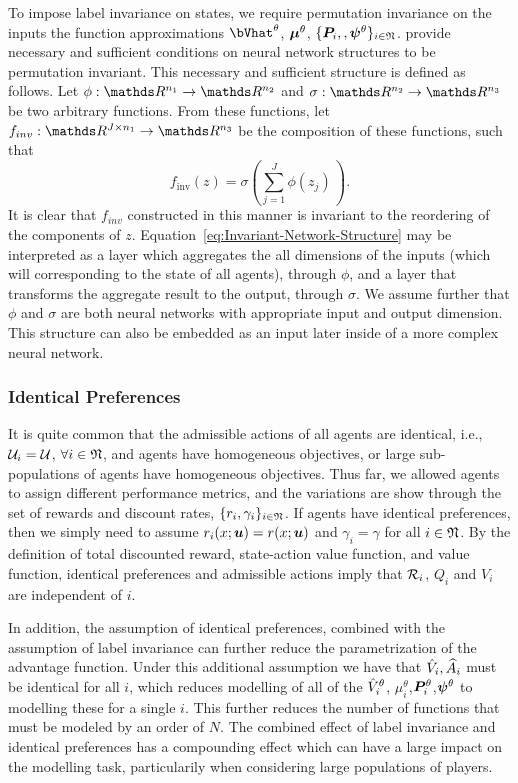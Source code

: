 \documentclass[onefignum,onetabnum]{siamonline171218}
\begin{document}
To impose label invariance on states, we require  permutation invariance on the inputs the function approximations $\bVhat^\theta$, $\bm{\mu}^{\theta}$, $\{\bm{P}_i,,\bm{\psi}^{\theta}\}_{i\in{\mathfrak{N}}}$. \cite{zaheer2017deep} provide necessary and sufficient conditions on neural network structures to be  permutation invariant. 
This necessary and sufficient structure is defined as follows. 
Let $\phi:\R^{n_1} \rightarrow \R^{n_2}$ and $\sigma:\R^{n_2} \rightarrow \R^{n_3}$ be two arbitrary functions. From these functions, let $f_{inv}:\R^{J \times n_1}\rightarrow\R^{n_3}$ be the composition of these functions, such that
\begin{equation} \label{eq:Invariant-Network-Structure}
	f_{\text{inv}}(z) = \sigma\left( \sum_{j=1}^J\phi( z_j ) \,\right).
\end{equation}
It is clear that $f_{inv}$ constructed in this manner is  invariant to the reordering of the components of $z$. Equation~\eqref{eq:Invariant-Network-Structure} may be interpreted as  a layer which aggregates the all dimensions of the inputs (which will corresponding to the state of all agents), through $\phi$, and a layer that transforms the aggregate result to the output, through $\sigma$. We assume further that $\phi$ and $\sigma$ are both neural networks with appropriate input and output dimension. This structure can also be embedded as an input later inside of a more complex neural network.


\subsubsection*{Identical Preferences}

It is quite common that  the admissible actions of all agents are identical,  i.e., $\mathcal{U}_i=\mathcal{U}$, $\forall i\in{\mathfrak{N}}$, and agents have  homogeneous   objectives, or large sub-populations of agents have homogeneous objectives.  Thus far, we allowed agents to assign different performance metrics, and the variations are show through the set of rewards and discount rates, $\{ r_i, \gamma_i \}_{i\in{\mathfrak{N}}}$. If agents have identical preferences, then we simply need to assume $r_i(x;{\bm{u}})=r(x;{\bm{u}})$ and $\gamma_i = \gamma$ for all $i\in{\mathfrak{N}}$. By the definition of total discounted reward, state-action value function, and value function, identical preferences and admissible actions imply that $\mathcal{R}_i$, $Q_i$ and $V_i$ are independent of $i$.

In addition, the assumption of identical preferences, combined with the assumption of label invariance can further reduce the parametrization of the advantage function. Under this additional assumption we have that $\hat{V}_i,\widehat{A}_i$ must be identical for all $i$, which reduces  modelling of all of the $\hat{V}_i^\theta$, $\mu_i^{\theta}$,$\bm{P}_i^\theta$,$\bm{\psi}^{\theta}$ to modelling these for a single $i$. This further reduces the number of functions that must be modeled by an order of $N$. The combined effect of label invariance and identical preferences has a compounding effect which can have a large impact on the modelling task, particularily when considering large populations of players.
\end{document}
